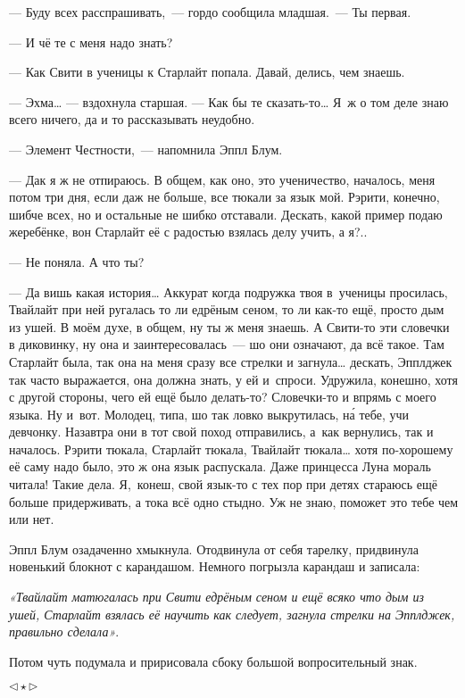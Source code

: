 \documentclass[fontsize=11pt,a5paper,titlepage=firstcover]{scrbook}
\begin{document}
--- Буду всех расспрашивать,~--- гордо сообщила младшая.~--- Ты первая.

--- И чё те с меня надо знать?

--- Как Свити в ученицы к Старлайт попала. Давай, делись, чем знаешь.

--- Эхма{\ldots} --- вздохнула старшая. --- Как бы те сказать-то{\ldots} Я~ж о том деле знаю всего ничего, да и то рассказывать неудобно.

--- Элемент Честности,~--- напомнила Эппл Блум.

--- Дак я ж не отпираюсь. В общем, как оно, это ученичество, началось, меня потом три дня, если даж не больше, все тюкали за язык мой. Рэрити, конечно, шибче всех, но и остальные не шибко отставали. Дескать, какой пример подаю жеребёнке, вон Старлайт её с радостью взялась делу учить, а я?..

--- Не поняла. А что ты?

--- Да вишь какая история{\ldots} Аккурат когда подружка твоя в~ученицы просилась, Твайлайт при ней ругалась то ли едрёным сеном, то ли как-то ещё, просто дым из ушей. В моём духе, в общем, ну ты ж меня знаешь. А Свити-то эти словечки в диковинку, ну она и заинтересовалась~--- шо они означают, да всё такое. Там Старлайт была, так она на меня сразу все стрелки и загнула{\ldots} дескать, Эпплджек так часто выражается, она должна знать, у ей и~спроси. Удружила, конешно, хотя с другой стороны, чего ей ещё было делать-то? Словечки-то и впрямь с моего языка. Ну и~вот. Молодец, типа, шо так ловко выкрутилась, на́ тебе, учи девчонку. Назавтра они в тот свой поход отправились, а~как вернулись, так и началось. Рэрити тюкала, Старлайт тюкала, Твайлайт тюкала{\ldots} хотя по-хорошему её саму надо было, это ж она язык распускала. Даже принцесса Луна мораль читала! Такие дела. Я,~конеш, свой язык-то с тех пор при детях стараюсь ещё больше придерживать, а тока всё одно стыдно. Уж не знаю, поможет это тебе чем или нет.

Эппл Блум озадаченно хмыкнула. Отодвинула от себя тарелку, придвинула новенький блокнот с карандашом. Немного погрызла карандаш и записала:

\emph{«Твайлайт матюгалась при Свити едрёным сеном и ещё всяко что дым из ушей, Старлайт взялась её научить как следует, загнула стрелки на Эпплджек, правильно сделала»}.

Потом чуть подумала и пририсовала сбоку большой вопросительный знак.
\begin{center}$\triangleleft\star\triangleright$\end{center}
\end{document}
